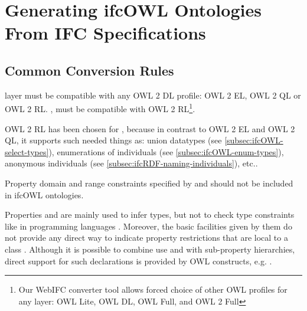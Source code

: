 
\section{Generating ifcOWL Ontologies From IFC Specifications}
\label{sec:ifcOWL}

\subsection{Common Conversion Rules}

\begin{ontologyRule}
\ifclite{} layer must be compatible with any OWL 2 DL profile: OWL 2 EL, OWL 2 QL or OWL 2 RL. \ifcstandard{}, \ifcadvanced{} must be compatible with OWL 2 RL\footnote{Our WebIFC converter tool allows forced choice of other OWL profiles for any layer: OWL Lite, OWL DL, OWL Full, and OWL 2 Full}.
\end{ontologyRule}


OWL 2 RL has been chosen for \ifcstandard{}, \ifcadvanced{} because in contrast to OWL 2 EL and OWL 2 QL, it supports such needed things as: union data\-types (see \ref{subsec:ifcOWL-select-types}), enumerations of individuals (see \ref{subsec:ifcOWL-enum-types}), anonymous individuals (see \ref{subsec:ifcRDF-naming-individuals}), etc.\cite{w3c:owl2-profiles}.

\begin{ontologyRule}
Property domain and range constraints specified by  and  should not be included in ifcOWL ontologies.
\end{ontologyRule}

Properties  and  are mainly used to infer types, but not to check type constraints like in programming languages \cite{w3c:owl-guide}. Moreover, the basic facilities given by them do not provide any direct way to indicate property restrictions that are local to a class \cite{w3c:rdf-schema}. Although it is possible to combine use  and  with sub-property hierarchies, direct support for such declarations is provided by OWL constructs, e.g. .

